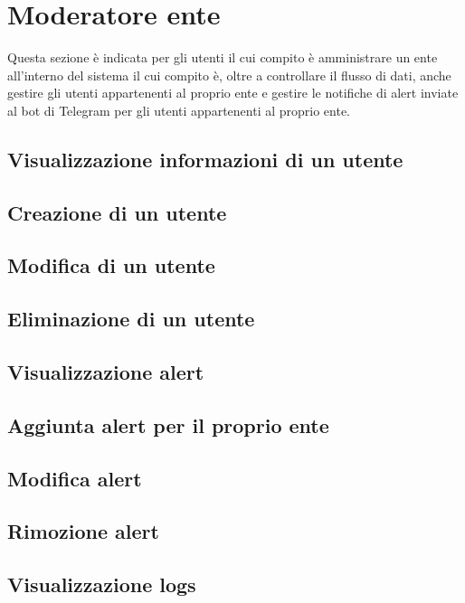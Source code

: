 \section{Moderatore ente}
Questa sezione è indicata per gli utenti il cui compito è amministrare un ente all'interno del sistema il cui compito è, oltre a controllare il flusso di dati, anche gestire gli utenti appartenenti al proprio ente e gestire le notifiche di alert inviate al bot di Telegram per gli utenti appartenenti al proprio ente.

\subsection{Visualizzazione informazioni di un utente}
\subsection{Creazione di un utente}
\subsection{Modifica di un utente}
\subsection{Eliminazione di un utente}
\subsection{Visualizzazione alert}
\subsection{Aggiunta alert per il proprio ente}
\subsection{Modifica alert}
\subsection{Rimozione alert}
\subsection{Visualizzazione logs}